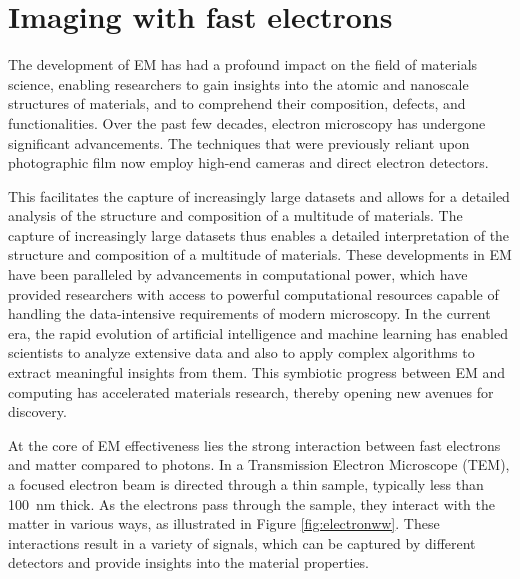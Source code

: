 \section{Imaging with fast electrons}

The development of EM has had a profound impact on the field of materials science, enabling researchers to gain insights into the atomic and nanoscale structures of materials, and to comprehend their composition, defects, and functionalities.
Over the past few decades, electron microscopy has undergone significant advancements.
The techniques that were previously reliant upon photographic film now employ high-end cameras and direct electron detectors.
\par This facilitates the capture of increasingly large datasets and allows for a detailed analysis of the structure and composition of a multitude of materials.
The capture of increasingly large datasets thus enables a detailed interpretation of the structure and composition of a multitude of materials.
These developments in EM have been paralleled by advancements in computational power, which have provided researchers with access to powerful computational resources capable of handling the data-intensive requirements of modern microscopy.
In the current era, the rapid evolution of artificial intelligence and machine learning has enabled scientists to analyze extensive data and also to apply complex algorithms to extract meaningful insights from them.
This symbiotic progress between EM and computing has accelerated materials research, thereby opening new avenues for discovery.

\par At the core of EM effectiveness lies the strong interaction between fast electrons and matter compared to photons.
In a Transmission Electron Microscope (TEM), a focused electron beam is directed through a thin sample, typically less than \SI{100}{\nano\metre} thick.
As the electrons pass through the sample, they interact with the matter in various ways, as illustrated in Figure \ref{fig:electronww}.
These interactions result in a variety of signals, which can be captured by different detectors and provide insights into the material properties.

